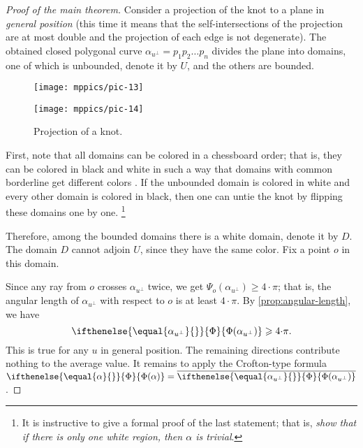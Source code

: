 \documentclass{article}
\theoremstyle{theorem}
\newtheorem{Crofton-type formula}[theorem]{Crofton-type formula}
\newtheorem{Douglas--Rado theorem}[theorem]{Douglas--Rado theorem}
\newtheorem{Extended monotonicity theorem}[theorem]{Extended monotonicity theorem}
\theoremstyle{definition}
\newcommand*{\tc}[1]{\ifthenelse{\equal{#1}{}}{\Phi}{\Phi({#1})}}%
\def\ge{\geqslant}
\begin{document}
\begin{proof}[Proof of the main theorem]
Consider a projection of the knot to a plane in \emph{general position}
(this time it means that the self-intersections of the projection are at most double and the projection of each edge is not degenerate).
The obtained closed polygonal curve $\alpha_{u^\perp}=p_1p_2\dots p_n$ divides the plane into domains, one of which is unbounded, denote it by $U$, and the others are bounded.

\begin{figure}[!ht]
\begin{minipage}{.48\textwidth}
\centering
\texttt{[image: mppics/pic-13]}
\end{minipage}\hfill
\begin{minipage}{.48\textwidth}
\centering
\texttt{[image: mppics/pic-14]}
\end{minipage}

\medskip

\begin{minipage}{.48\textwidth}
\centering
\caption{Projection of an unknot.}
\end{minipage}\hfill
\begin{minipage}{.48\textwidth}
\centering
\caption{Projection of a knot.}
\end{minipage}
\vskip-0mm
\end{figure}

First, note that all domains can be colored in a chessboard order;
that is, they can be colored in black and white in such a way that domains with common borderline get different colors \cite[Exercise 2.27]{adams}.
If the unbounded domain is colored in white and every other domain is colored in black, then one can untie the knot by flipping these domains one by one.%
\footnote{It is instructive to give a formal proof of the last statement; that is, \textit{show that if there is only one white region, then $\alpha$ is trivial}.}

Therefore, among the bounded domains there is a white domain, denote it by $D$.
The domain $D$ cannot adjoin %
$U$, since they have the same color.
Fix a point $o$ in this domain.

Since any ray from $o$ crosses $\alpha_{u^\perp}$ twice, we get $\Psi_o(\alpha_{u^\perp})\ge 4{\cdot}\pi$;
that is, the angular length of $\alpha_{u^\perp}$ with respect to $o$ is at least $4{\cdot}\pi$. 
By \ref{prop:angular-length}, we have 
\[\tc{\alpha_{u^\perp}}\ge4{\cdot}\pi.\]
This is true for any $u$ in general position.
The remaining directions contribute nothing to the average value.
It remains to apply the Crofton-type formula $\tc{\alpha}=\overline{\tc{\alpha_{u^\perp}}}$.
\end{proof}
\end{document}
